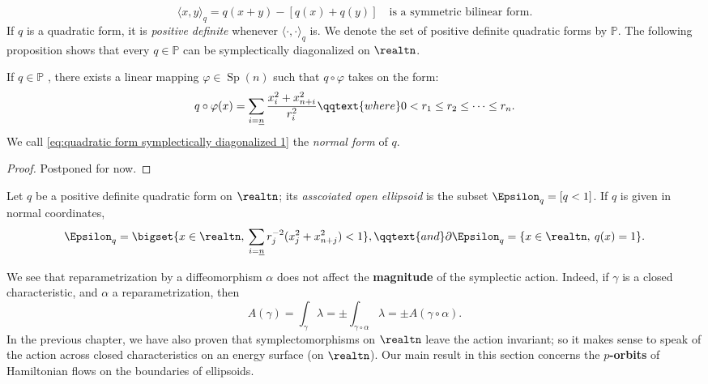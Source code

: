 \documentclass[../main-v2-manifolds.tex]{subfiles}
\begin{document}
\[
   \langle x,y\rangle_{q} = q(x+y) - [q(x)+q(y)]\quad\text{is a symmetric bilinear form.}
\]
If $q$ is a quadratic form, it is \emph{positive definite} whenever $\langle \cdot,\cdot\rangle_q$ is. We denote the set of positive definite quadratic forms by $\mathbb{P}$. The following proposition shows that every $q\in\mathbb{P}$  can be symplectically diagonalized on $\realtn$. 
\begin{wts}
    If $q\in \mathbb{P}$ , there exists a linear mapping $\varphi\in\operatorname{Sp}(n)$ such that $q\circ \varphi$  takes on the form:
    \begin{equation}
    q\circ\varphi(x) = \sum_{i=\underline{n}} \frac{x_i^2 + x_{n+i}^2}{r_i^2}\qqtext{where} 0<r_1\leq r_2\leq\cdots\leq r_n.
    \label{eq:quadratic form symplectically diagonalized 1}
\end{equation}
    We call \cref{eq:quadratic form symplectically diagonalized 1} the \emph{normal form} of $q$.
\end{wts}
\begin{proof}
    Postponed for now.
\end{proof}
\begin{definition}
    Let $q$ be a positive definite quadratic form on $\realtn$; its \emph{asscoiated open ellipsoid}  is the subset $\Epsilon_q=[q<1]$. If $q$ is given in normal coordinates,
    \[
        \Epsilon_q = \bigset{x\in\realtn,\:\sum_{i=\underline{n}} r_j^{-2}(x_j^2 + x_{n+j}^2)<1}, \qqtext{and} \partial \Epsilon_q = \{x\in\realtn, \: q(x) = 1\}.
    \]
\end{definition}
We see that reparametrization by a diffeomorphism $\alpha$ does not affect the \textbf{magnitude} of the symplectic action. Indeed, if $\gamma$ is a closed characteristic, and $\alpha$ a reparametrization, then 
\[
  A(\gamma)=\int_{\gamma}\lambda = \pm \int_{\gamma\circ\alpha}\lambda = \pm A(\gamma\circ \alpha).
\]
In the previous chapter, we have also proven that symplectomorphisms on $\realtn$ leave the action invariant; so it makes sense to speak of the action across closed characteristics on an energy surface (on $\realtn$). Our main result in this section concerns the \textbf{$p$-orbits} of Hamiltonian flows on the boundaries of ellipsoids. \\
\end{document}
